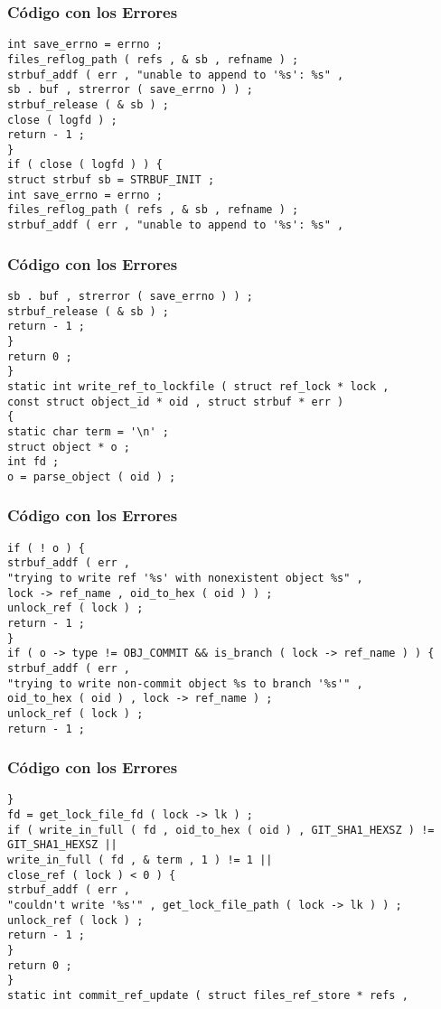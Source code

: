 \documentclass{beamer}
\begin{document}
\begin{frame}[fragile]
\frametitle{C\'odigo con los Errores}
\begin{verbatim}
int save_errno = errno ; 
files_reflog_path ( refs , & sb , refname ) ; 
strbuf_addf ( err , "unable to append to '%s': %s" , 
sb . buf , strerror ( save_errno ) ) ; 
strbuf_release ( & sb ) ; 
close ( logfd ) ; 
return - 1 ; 
} 
if ( close ( logfd ) ) { 
struct strbuf sb = STRBUF_INIT ; 
int save_errno = errno ; 
files_reflog_path ( refs , & sb , refname ) ; 
strbuf_addf ( err , "unable to append to '%s': %s" , 
\end{verbatim}
\end{frame}
\begin{frame}[fragile]
\frametitle{C\'odigo con los Errores}
\begin{verbatim}
sb . buf , strerror ( save_errno ) ) ; 
strbuf_release ( & sb ) ; 
return - 1 ; 
} 
return 0 ; 
} 
static int write_ref_to_lockfile ( struct ref_lock * lock , 
const struct object_id * oid , struct strbuf * err ) 
{ 
static char term = '\n' ; 
struct object * o ; 
int fd ; 
o = parse_object ( oid ) ; 
\end{verbatim}
\end{frame}
\begin{frame}[fragile]
\frametitle{C\'odigo con los Errores}
\begin{verbatim}
if ( ! o ) { 
strbuf_addf ( err , 
"trying to write ref '%s' with nonexistent object %s" , 
lock -> ref_name , oid_to_hex ( oid ) ) ; 
unlock_ref ( lock ) ; 
return - 1 ; 
} 
if ( o -> type != OBJ_COMMIT && is_branch ( lock -> ref_name ) ) { 
strbuf_addf ( err , 
"trying to write non-commit object %s to branch '%s'" , 
oid_to_hex ( oid ) , lock -> ref_name ) ; 
unlock_ref ( lock ) ; 
return - 1 ; 
\end{verbatim}
\end{frame}
\begin{frame}[fragile]
\frametitle{C\'odigo con los Errores}
\begin{verbatim}
} 
fd = get_lock_file_fd ( lock -> lk ) ; 
if ( write_in_full ( fd , oid_to_hex ( oid ) , GIT_SHA1_HEXSZ ) != GIT_SHA1_HEXSZ || 
write_in_full ( fd , & term , 1 ) != 1 || 
close_ref ( lock ) < 0 ) { 
strbuf_addf ( err , 
"couldn't write '%s'" , get_lock_file_path ( lock -> lk ) ) ; 
unlock_ref ( lock ) ; 
return - 1 ; 
} 
return 0 ; 
} 
static int commit_ref_update ( struct files_ref_store * refs , 
\end{verbatim}
\end{frame}
\end{document}
